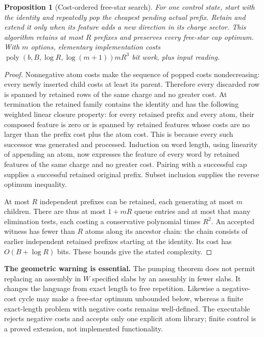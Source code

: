 \documentclass[11pt,a4paper]{article}
\newtheorem{proposition}[proposition]{Proposition}
\theoremstyle{definition}
\newcommand{\poly}{\operatorname{poly}}
\newcommand{\code}[1]{\texttt{\detokenize{#1}}}
\begin{document}
\begin{proposition}[Cost-ordered free-star search]\label{prop:staralgorithm}
For one control state, start with the identity and repeatedly pop the cheapest pending actual prefix. Retain and extend it only when its feature adds a new direction in its charge sector. This algorithm retains at most $R$ prefixes and preserves every free-star cap optimum. With $m$ options, elementary implementation costs $\poly(b,B,\log R,\log(m+1))mR^3$ bit work, plus input reading.
\end{proposition}
\begin{proof}
Nonnegative atom costs make the sequence of popped costs nondecreasing: every newly inserted child costs at least its parent. Therefore every discarded row is spanned by retained rows of the same charge and no greater cost. At termination the retained family contains the identity and has the following weighted linear closure property: for every retained prefix and every atom, their composed feature is zero or is spanned by retained features whose costs are no larger than the prefix cost plus the atom cost. This is because every such successor was generated and processed. Induction on word length, using linearity of appending an atom, now expresses the feature of every word by retained features of the same charge and no greater cost. Pairing with a successful cap supplies a successful retained original prefix. Subset inclusion supplies the reverse optimum inequality.

At most $R$ independent prefixes can be retained, each generating at most $m$ children. There are thus at most $1+mR$ queue entries and at most that many elimination tests, each costing a conservative polynomial times $R^2$. An accepted witness has fewer than $R$ atoms along its ancestor chain: the chain consists of earlier independent retained prefixes starting at the identity. Its cost has $O(B+\log R)$ bits. These bounds give the stated complexity.
\end{proof}

\textbf{The geometric warning is essential.} The pumping theorem does not permit replacing an assembly in $W$ specified slabs by an assembly in fewer slabs. It changes the language from exact length to free repetition. Likewise a negative-cost cycle may make a free-star optimum unbounded below, whereas a finite exact-length problem with negative costs remains well-defined. The executable \code{star_search.py} rejects negative costs and accepts only one explicit atom library; finite control is a proved extension, not implemented functionality.
\end{document}
